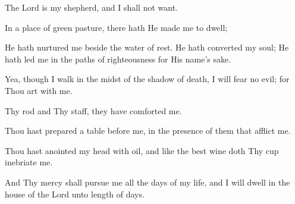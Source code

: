 The Lord is my shepherd, and I shall not want.

In a place of green pasture, there hath He made me to dwell;

He hath nurtured me beside the water of rest. He hath converted my soul; He hath led me in the paths of righteousness for His name's sake.

Yea, though I walk in the midst of the shadow of death, I will fear no evil; for Thou art with me.

Thy rod and Thy staff, they have comforted me.

Thou hast prepared a table before me, in the presence of them that afflict me.

Thou hast anointed my head with oil, and like the best wine doth Thy cup inebriate me.

And Thy mercy shall pursue me all the days of my life, and I will dwell in the house of the Lord unto length of days.

